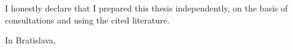 \newpage
\thispagestyle{empty}

\vspace*{\fill}
\noindent
I honestly declare that I prepared this thesis independently, on the basis of consultations and using the cited literature.

\vspace{1cm}

\noindent
In Bratislava, \myDateENBPOne

\vspace{1.5cm}

\hfill \myName

\newpage

\thispagestyle{empty}
\mbox{}
\newpage


